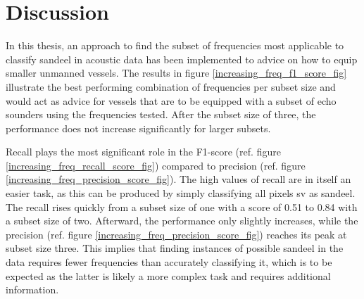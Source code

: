 \chapter{Discussion}
    
    In this thesis, an approach to find the subset of frequencies most applicable to classify sandeel in acoustic data has been implemented to advice on how to equip smaller unmanned vessels. The results in figure  \ref{increasing_freq_f1_score_fig} illustrate the best performing combination of frequencies per subset size and would act as advice for vessels that are to be equipped  with a subset of echo sounders using the frequencies tested. After the subset size of three, the performance does not increase significantly for larger subsets. 
    
    
    
    
    Recall plays the most significant role in the F1-score (ref. figure \ref{increasing_freq_recall_score_fig}) compared to precision (ref. figure \ref{increasing_freq_precision_score_fig}). The high values of recall are in itself an easier task, as this can be produced by simply classifying all pixels \gls{sv} as sandeel. The recall rises quickly from a subset size of one with a score of 0.51 to 0.84 with a subset size of two. Afterward, the performance  only slightly increases, while the precision (ref. figure \ref{increasing_freq_precision_score_fig}) reaches its peak at subset size three. This implies that finding instances of possible sandeel in the data requires fewer frequencies than accurately classifying it, which is to be expected as the latter is likely a more complex task and requires additional information. 
    

